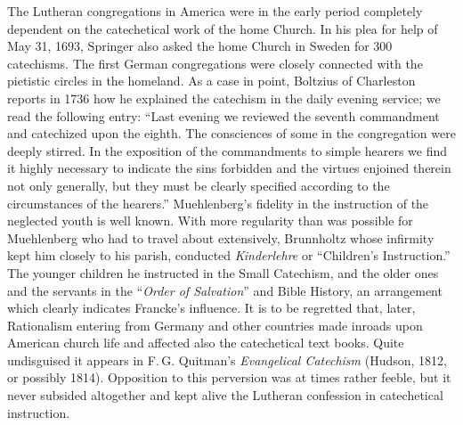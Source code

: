 The Lutheran congregations in America were in the early period completely dependent on the catechetical work of the home Church. In his plea for help of May 31, 1693,
Springer also asked the home Church in Sweden for 300 catechisms. The first German congregations were closely connected with the pietistic circles in the homeland. As a case in point, Boltzius of Charleston reports in 1736 how he explained the catechism in the daily evening service; we read the following entry: “Last evening we reviewed the seventh commandment and catechized upon the eighth. The consciences of some in the congregation were deeply stirred. In the exposition of the commandments to simple hearers we find it highly necessary to indicate the sins forbidden and the virtues enjoined therein not only generally, but they must be clearly specified according to the circumstances of the hearers.” Muehlenberg’s fidelity in the instruction of the neglected youth is well known. With more regularity than was possible for Muehlenberg who had to travel about extensively, Brunnholtz whose infirmity kept him closely to his parish, conducted \emph{Kinderlehre} or “Children’s Instruction.” The younger children he instructed in the Small Catechism, and the older ones and the servants in the “\emph{Order of Salvation}” and Bible History, an arrangement which clearly indicates Francke’s influence. It is to be regretted that, later, Rationalism entering from Germany and other countries made inroads upon American church life and affected also the catechetical text books. Quite undisguised it appears in F.\,G. Quitman’s \emph{Evangelical Catechism} (Hudson, 1812, or possibly 1814). Opposition to this perversion was at times rather feeble, but it never subsided altogether and kept alive the Lutheran confession in catechetical instruction.

